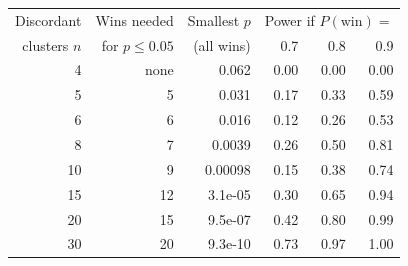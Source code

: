 \begin{tabular}{rrrrrr}
\toprule
Discordant & Wins needed & Smallest $p$ & \multicolumn{3}{c}{Power if $P(\text{win})=$} \\
clusters $n$ & for $p\le 0.05$ & (all wins) & 0.7 & 0.8 & 0.9 \\
\midrule
4 & none & 0.062 & 0.00 & 0.00 & 0.00 \\
5 & 5 & 0.031 & 0.17 & 0.33 & 0.59 \\
6 & 6 & 0.016 & 0.12 & 0.26 & 0.53 \\
8 & 7 & 0.0039 & 0.26 & 0.50 & 0.81 \\
10 & 9 & 0.00098 & 0.15 & 0.38 & 0.74 \\
15 & 12 & 3.1e-05 & 0.30 & 0.65 & 0.94 \\
20 & 15 & 9.5e-07 & 0.42 & 0.80 & 0.99 \\
30 & 20 & 9.3e-10 & 0.73 & 0.97 & 1.00 \\
\bottomrule
\end{tabular}
